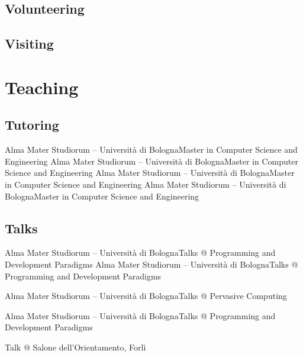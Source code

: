 \documentclass[11pt,a4paper,roman]{moderncv}        %
\begin{document}
\subsection{Volunteering}
\subsection{Visiting}
\section{Teaching}

\subsection{Tutoring}
%
 {Alma Mater Studiorum -- Università di Bologna}{Master in Computer Science and Engineering}
 {}{}
%
 {Alma Mater Studiorum -- Università di Bologna}{Master in Computer Science and Engineering}
 {}{}
%
 {Alma Mater Studiorum -- Università di Bologna}{Master in Computer Science and Engineering}
 {}{}
%
 {Alma Mater Studiorum -- Università di Bologna}{Master in Computer Science and Engineering}
 {}{}
\subsection{Talks}
%
{Alma Mater Studiorum -- Università di Bologna}{Talks @ Programming and Development Paradigms}
{}{}
%
{Alma Mater Studiorum -- Università di Bologna}{Talks @ Programming and Development Paradigms}
{}{}

%
{Alma Mater Studiorum -- Università di Bologna}{Talks @ Pervasive Computing}
{}{}

%
{Alma Mater Studiorum -- Università di Bologna}{Talks @ Programming and Development Paradigms}
{}{}

%
{Talk @ Salone dell'Orientamento, Forlì}{}
{}{}
\end{document}
